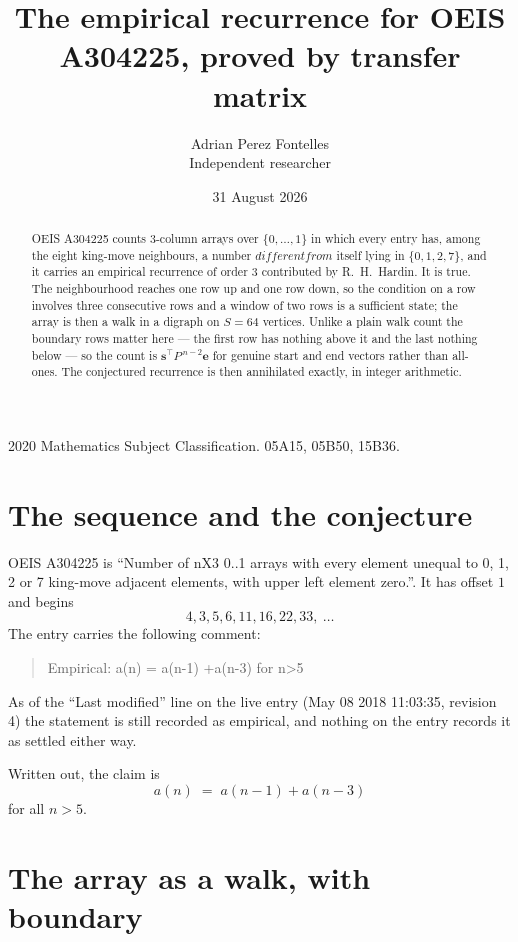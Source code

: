 \documentclass[11pt,a4paper]{article}
\title{The empirical recurrence for OEIS A304225, proved by transfer matrix}
\author{Adrian Perez Fontelles\\ \small Independent researcher}
\date{31 August 2026}
\theoremstyle{plain}
\theoremstyle{definition}
\begin{document}
\maketitle

\begin{abstract}
OEIS A304225 counts $3$-column arrays over $\{0,\dots,1\}$ in which every entry has,
among the eight king-move neighbours, a number $different from$ itself lying in $\{0,1,2,7\}$, and it carries an empirical
recurrence of order $3$ contributed by R.~H.~Hardin. It is true. The neighbourhood
reaches one row up and one row down, so the condition on a row involves three consecutive
rows and a window of two rows is a sufficient state; the array is then a walk in a digraph
on $S=64$ vertices. Unlike a plain walk count the boundary rows matter here --- the first
row has nothing above it and the last nothing below --- so the count is
$\mathbf{s}^{\!\top}P^{\,n-2}\mathbf{e}$ for genuine start and end vectors rather than
all-ones. The conjectured recurrence is then annihilated exactly, in integer arithmetic.
\end{abstract}

\noindent\small 2020 Mathematics Subject Classification. 05A15, 05B50, 15B36.\normalsize

\section{The sequence and the conjecture}

OEIS A304225 is ``Number of nX3 0..1 arrays with every element unequal to 0, 1, 2 or 7 king-move adjacent elements, with upper left element zero.''. It has offset
$1$ and begins
\[
4, 3, 5, 6, 11, 16, 22, 33,\ \dots
\]
The entry carries the following comment:
\begin{quote}\small
Empirical: a(n) = a(n-1) +a(n-3) for n>5
\end{quote}
As of the ``Last modified'' line on the live entry (May 08 2018 11:03:35, revision
4) the statement is still recorded as empirical, and nothing on the entry
records it as settled either way.

Written out, the claim is
\begin{equation}\label{eq:conj}
a(n)\;=\;a(n-1) + a(n-3)
\end{equation}
for all $n>5$.

\section{The array as a walk, with boundary}
\end{document}
